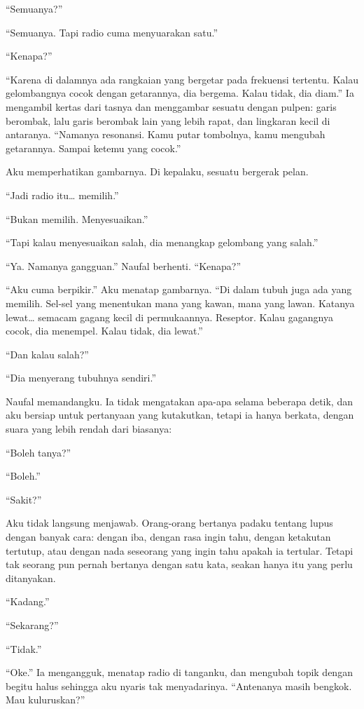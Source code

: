 \documentclass[11pt,twoside,openany]{book}
\begin{document}
``Semuanya?''

``Semuanya. Tapi radio cuma menyuarakan satu.''

``Kenapa?''

``Karena di dalamnya ada rangkaian yang bergetar pada frekuensi tertentu. Kalau gelombangnya cocok dengan getarannya, dia bergema. Kalau tidak, dia diam.'' Ia mengambil kertas dari tasnya dan menggambar sesuatu dengan pulpen: garis berombak, lalu garis berombak lain yang lebih rapat, dan lingkaran kecil di antaranya. ``Namanya resonansi. Kamu putar tombolnya, kamu mengubah getarannya. Sampai ketemu yang cocok.''

Aku memperhatikan gambarnya. Di kepalaku, sesuatu bergerak pelan.

``Jadi radio itu\ldots{} memilih.''

``Bukan memilih. Menyesuaikan.''

``Tapi kalau menyesuaikan salah, dia menangkap gelombang yang salah.''

``Ya. Namanya gangguan.'' Naufal berhenti. ``Kenapa?''

``Aku cuma berpikir.'' Aku menatap gambarnya. ``Di dalam tubuh juga ada yang memilih. Sel-sel yang menentukan mana yang kawan, mana yang lawan. Katanya lewat\ldots{} semacam gagang kecil di permukaannya. Reseptor. Kalau gagangnya cocok, dia menempel. Kalau tidak, dia lewat.''

``Dan kalau salah?''

``Dia menyerang tubuhnya sendiri.''

Naufal memandangku. Ia tidak mengatakan apa-apa selama beberapa detik, dan aku bersiap untuk pertanyaan yang kutakutkan, tetapi ia hanya berkata, dengan suara yang lebih rendah dari biasanya:

``Boleh tanya?''

``Boleh.''

``Sakit?''

Aku tidak langsung menjawab. Orang-orang bertanya padaku tentang lupus dengan banyak cara: dengan iba, dengan rasa ingin tahu, dengan ketakutan tertutup, atau dengan nada seseorang yang ingin tahu apakah ia tertular. Tetapi tak seorang pun pernah bertanya dengan satu kata, seakan hanya itu yang perlu ditanyakan.

``Kadang.''

``Sekarang?''

``Tidak.''

``Oke.'' Ia mengangguk, menatap radio di tanganku, dan mengubah topik dengan begitu halus sehingga aku nyaris tak menyadarinya. ``Antenanya masih bengkok. Mau kuluruskan?''
\end{document}
